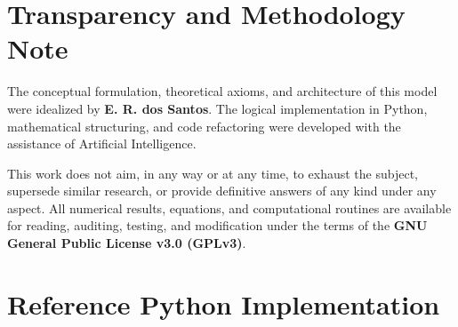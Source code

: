 \documentclass[11pt,a4paper]{article}
\begin{document}
\section*{Transparency and Methodology Note}
The conceptual formulation, theoretical axioms, and architecture of this model were idealized by \textbf{E. R. dos Santos}. The logical implementation in Python, mathematical structuring, and code refactoring were developed with the assistance of Artificial Intelligence.

This work does not aim, in any way or at any time, to exhaust the subject, supersede similar research, or provide definitive answers of any kind under any aspect. All numerical results, equations, and computational routines are available for reading, auditing, testing, and modification under the terms of the \textbf{GNU General Public License v3.0 (GPLv3)}.

\appendix
\section{Reference Python Implementation}
\footnotesize

\end{document}
